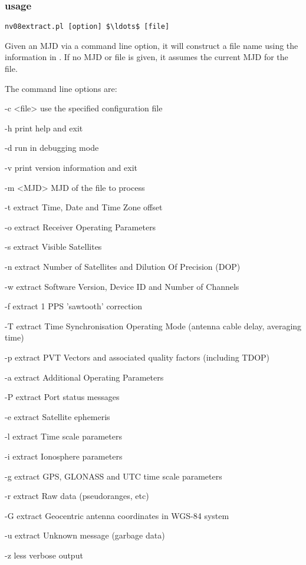 \subsubsection{usage}

\begin{lstlisting}[mathescape=true]
nv08extract.pl [option] $\ldots$ [file]
\end{lstlisting}

Given an MJD via a command line option, it will construct a file name using the information in . If no MJD or file is given, it assumes the current MJD for the file. 

The command line options are:
\begin{description*}
	\item[-c \textless{file}\textgreater] use the specified configuration file
	\item[-h] print help and exit
	\item[-d] run in debugging mode
	\item[-v] print version information and exit
	\item[-m \textless{MJD}\textgreater]  MJD of the file to process
	\item[-t] extract Time, Date and Time Zone offset
	\item[-o] extract Receiver Operating Parameters
	\item[-s] extract Visible Satellites
	\item[-n] extract Number of Satellites and Dilution Of Precision (DOP)
	\item[-w] extract Software Version, Device ID and Number of Channels
	\item[-f] extract 1 PPS 'sawtooth' correction
	\item[-T] extract Time Synchronisation Operating Mode (antenna cable delay, averaging time)
	\item[-p] extract PVT Vectors and associated quality factors (including TDOP)
	\item[-a] extract Additional Operating Parameters
	\item[-P] extract Port status messages
	\item[-e] extract Satellite ephemeris
	\item[-l] extract Time scale parameters
	\item[-i] extract Ionosphere parameters
	\item[-g] extract GPS, GLONASS and UTC time scale parameters
	\item[-r] extract Raw data (pseudoranges, etc)
	\item[-G] extract Geocentric antenna coordinates in WGS-84 system
	\item[-u] extract Unknown message (garbage data)
	\item[-z] less verbose output
\end{description*}

